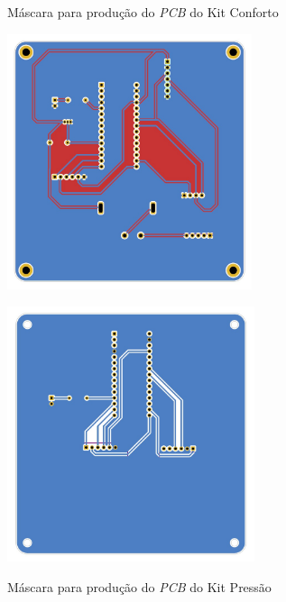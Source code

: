 \documentclass[acronym,symbols,table]{fei}
\begin{document}
\begin{figure}[!htb]
    \centering
    \begin{minipage}{0.45\textwidth}
        \caption{Máscara para produção do \textit{PCB} do Kit Conforto}
        \includegraphics[width=\linewidth, height=7.5cm]{Imagens/mascaraconforto.jpg} 
        \label{fig:mascaraconfort}
    \end{minipage}\hfill
    \begin{minipage}{0.45\textwidth}
        \caption{Máscara para produção do \textit{PCB} do Kit Pressão}
        \includegraphics[width=\linewidth, height=7.5cm]{Imagens/mascarapressao.jpg} 
        \label{fig:mascarapressao}
    \end{minipage}
\end{figure}
\end{document}
